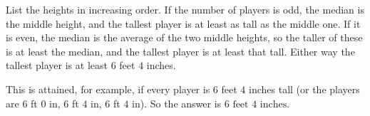 List the heights in increasing order. If the number of players is odd, the median is the middle height, and the tallest player is at least as tall as the middle one. If it is even, the median is the average of the two middle heights, so the taller of these is at least the median, and the tallest player is at least that tall. Either way the tallest player is at least $6$ feet $4$ inches.

This is attained, for example, if every player is $6$ feet $4$ inches tall (or the players are $6$ ft $0$ in, $6$ ft $4$ in, $6$ ft $4$ in). So the answer is $\boxed{6\text{ feet }4\text{ inches}}$.

